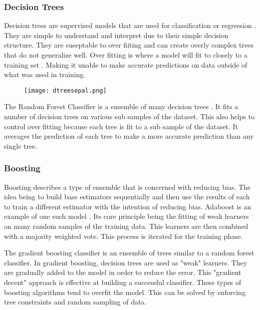 \subsubsection{Decision Trees}
Decision trees are supervised models that are used for classification or regression \cite{breiman2017classification}.
They are simple to understand and interpret due to their simple decision structure. 
They are suseptable to over fiiting and can create overly complex trees that do not generalize well.
Over fitting is where a model will fit to closely to a training set \cite{cawley2010over}. 
Making it unable to make accurate predictions on data outside of what was used in training.

\begin{figure}[]
    \centering
    \texttt{[image: dtreesepal.png]}
    \caption{}
    \label{}
\end{figure}

\par
The Random Forest Classifier is a ensemble of many decision trees \cite{breiman2001random}.
It fits a number of decision trees on various sub samples of the dataset.
This also helps to control over fitting because each tree is fit to a sub sample of the dataset.
It averages the prediction of each tree to make a more accurate prediction than any single tree.


\subsubsection{Boosting}
Boosting describes a type of ensemble that is concerned with reducing bias.
The idea being to build base estimators sequentially and then use the results of each to train a different estimator with the intention of reducing bias.
Adaboost is an example of one such model \cite{freund1995desicion}.
Its core principle being the fitting of weak learners on many random samples of the training data.
This learners are then combined with a majority weighted vote. 
This process is iterated for the training phase.



\par
The gradient boosting classifier is an ensemble of trees similar to a random forest classifier.
In gradient boosting, decision trees are used as "weak" learners.
They are gradually added to the model in order to reduce the error.
This "gradient decent" approach is effective at building a successful classifier.
These types of boosting algorithms tend to overfit the model.
This can be solved by enforcing tree constraints and random sampling of data.


